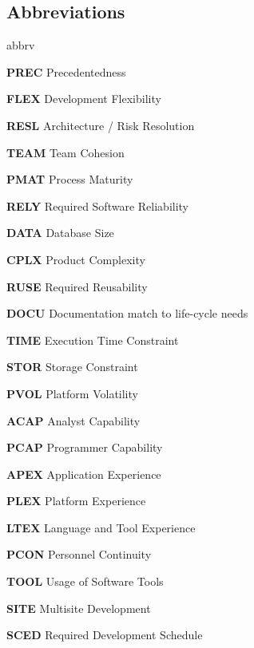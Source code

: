 \subsection{Abbreviations}
	\begin{labeling}{abbrv}
		\item[\textbf{PREC}] Precedentedness
		\item[\textbf{FLEX}] Development Flexibility
		\item[\textbf{RESL}] Architecture / Risk Resolution
		\item[\textbf{TEAM}] Team Cohesion
		\item[\textbf{PMAT}] Process Maturity
	
		\item[\textbf{RELY}] Required Software Reliability
		\item[\textbf{DATA}] Database Size
		\item[\textbf{CPLX}] Product Complexity
		\item[\textbf{RUSE}] Required Reusability
		\item[\textbf{DOCU}] Documentation match to life-cycle needs
		\item[\textbf{TIME}] Execution Time Constraint
		\item[\textbf{STOR}] Storage Constraint
		\item[\textbf{PVOL}] Platform Volatility
		\item[\textbf{ACAP}] Analyst Capability
		\item[\textbf{PCAP}] Programmer Capability
		\item[\textbf{APEX}] Application Experience
		\item[\textbf{PLEX}] Platform Experience
		\item[\textbf{LTEX}] Language and Tool Experience
		\item[\textbf{PCON}] Personnel Continuity
		\item[\textbf{TOOL}] Usage of Software Tools
		\item[\textbf{SITE}] Multisite Development
		\item[\textbf{SCED}] Required Development Schedule
	\end{labeling}
